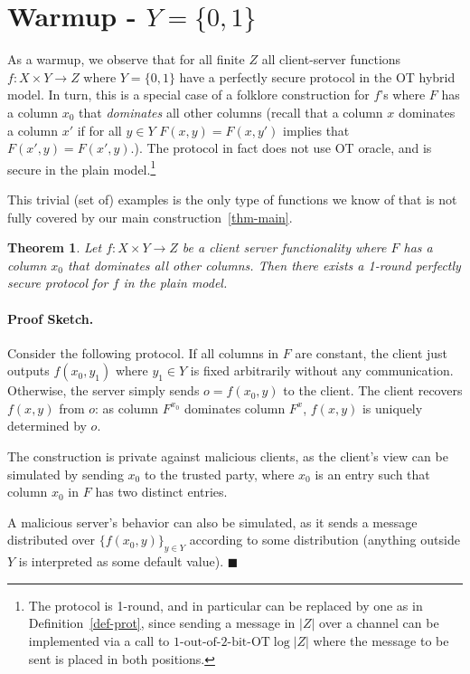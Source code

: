 \documentclass[a4paper]{article}
\newtheorem{theorem}{Theorem}[section]
\newcommand{\OT}[2]{#1\text{-out-of-}#2\text{-bit-OT}}
\begin{document}
\section{Warmup - $Y=\{0,1\}$}

As a warmup, we observe that for all finite $Z$
all client-server functions $f:X\times Y\rightarrow Z$ where $Y=\{0,1\}$
have a perfectly secure protocol in the OT hybrid model. In turn, this is a special case of a folklore construction for $f$'s where $F$ has a column $x_0$ that \emph{dominates} all other columns (recall that a column $x$ dominates a column $x'$ if for all $y\in Y$ $F(x,y)=F(x,y')$ implies that  $F(x',y)=F(x',y)$.). 
The protocol in fact does not use OT oracle, and is secure in the plain model.\footnote{The protocol is 1-round, and in particular can be replaced by one as in Definition~\ref{def-prot}, since sending a message in $|Z|$ over a channel can be implemented via a call to $\OT{1}{2}{\log{|Z|}}$ where the message to be sent is placed in both positions.}

This trivial (set of) examples is the only type of functions we know of that is not fully covered by our main construction~\ref{thm-main}. 

\begin{theorem}
	Let $f:X\times Y\rightarrow Z$ be a client server functionality where $F$ has a column $x_0$ that dominates all other columns. Then there exists a 1-round perfectly secure protocol for $f$ in the plain model.
\end{theorem}

\paragraph{Proof Sketch.} Consider the following protocol.
If all columns in $F$ are constant, the client just outputs $f(x_0,y_1)$ where $y_1\in Y$ is fixed arbitrarily without any communication. Otherwise, the server simply sends $o=f(x_0,y)$ to the client.
The client recovers $f(x,y)$ from $o$: as column $F^{x_0}$ dominates 
column $F^x$, $f(x,y)$ is uniquely determined by $o$.

The construction is private against malicious clients, as the client's view can be simulated by sending $x_0$ to the trusted party, where $x_0$ is an entry such that column $x_0$ in $F$ has two distinct entries.

A malicious server's behavior can also be simulated, as it sends a message distributed over $\{f(x_0,y)\}_{y\in Y}$ according to some distribution (anything outside $Y$ is interpreted as some default value). \hspace*{385pt}$\blacksquare$ 
\end{document}

